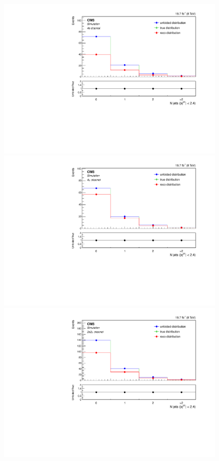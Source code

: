 \begin{figure}[hbtp]
  \begin{center}
    \includegraphics[width=0.8\cmsFigWidth]{Figures/Unfolding/MCTests/CentralJets_ZZTo4e_MadMatrix_MadDistr_FullSample_fr}     
    \includegraphics[width=0.8\cmsFigWidth]{Figures/Unfolding/MCTests/CentralJets_ZZTo4m_MadMatrix_MadDistr_FullSample_fr}     
    \includegraphics[width=0.8\cmsFigWidth]{Figures/Unfolding/MCTests/CentralJets_ZZTo2e2m_MadMatrix_MadDistr_FullSample_fr}

\end{center}
\end{figure}
